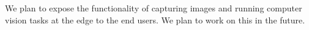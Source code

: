 We plan to expose the functionality of capturing images and running computer vision tasks at the edge to the end users. We plan to work on this in the future. 